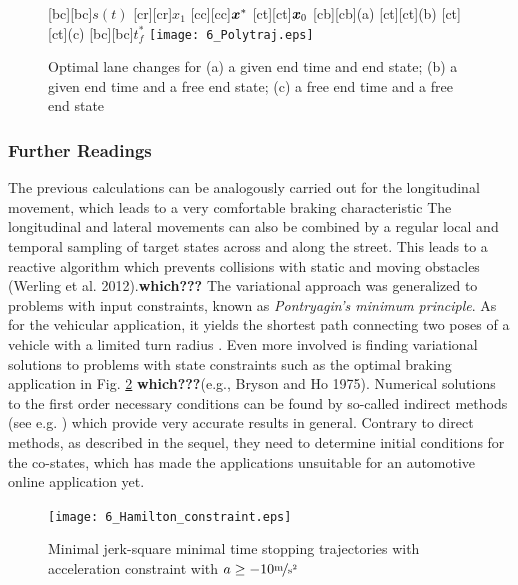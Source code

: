 \begin{figure}[h]
\centering
	[bc][bc]{$s(t)$}
	[cr][cr]{$x_1$}
	[cc][cc]{$\boldsymbol{x}^\ast$}
	[ct][ct]{$\boldsymbol{x}_0$}
	[cb][cb]{\scriptsize (a)}
	[ct][ct]{\scriptsize (b)}
	[ct][ct]{\scriptsize (c)}
	[bc][bc]{$t_f^\ast$}
	\centering
  	\texttt{[image: 6\_Polytraj.eps]}
  \caption{Optimal lane changes for (a) a given end time and end state; (b) a given end time and a free end state; (c) a free end time and a free end state}
    \label{fig:polytraj}
\end{figure}

\subsubsection{Further Readings}\label{S:57.3.1.3}

The previous calculations can be analogously carried out for the longitudinal movement, which leads to a very comfortable braking characteristic \cite{gutjahr2014automatic} %
The longitudinal and lateral movements can also be combined by a regular local and temporal sampling of target states across and along the street. 
This leads to a reactive algorithm which prevents collisions with static and moving obstacles (Werling et al. 2012).\textbf{which???}
The variational approach was generalized to problems with input constraints, known as \textit{Pontryagin's minimum principle}.
 As for the vehicular application, it yields the shortest path connecting two poses of a vehicle with a limited turn radius \cite{dubins1957cml,reeds1990optimal,boissonnat1994note}. %
Even more involved is finding variational solutions to problems with state constraints such as the optimal braking application in Fig. \ref{fig:poly_mit_unb} \textbf{which???}(e.g., Bryson and Ho 1975).
Numerical solutions to the first order necessary conditions can be found by so-called indirect methods (see e.g.  \cite{Graichen2012} )%
which provide very accurate results in general. Contrary to direct methods, as described in the sequel, they need to determine initial conditions for the co-states, which has made the applications unsuitable for an automotive online application yet.





\begin{figure}[ht]
\centering

\renewcommand{\matlabtextA}{\normalsize }
	\def\ylabelV{$x_2$ in $\unitfrac{m}{s}$}
	\def\ylabelA{$x_3$ in $\unitfrac{m}{s^2}$}
	\def\xlabelT{$t$ in $\unit{s}$}
	\def\xlabelX{$x_1$ in $\unit{m}$}
	\centering
  	\texttt{[image: 6\_Hamilton\_constraint.eps]}
  \caption{Minimal jerk-square minimal time stopping trajectories with acceleration constraint with $a\geq -10 \unitfrac{m}{s^2}$}
    \label{fig:poly_mit_unb}
\end{figure}



